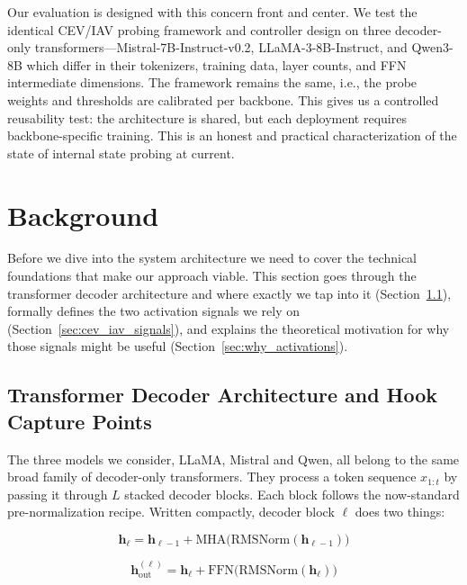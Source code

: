 Our evaluation is designed with this concern front and center. We test the identical CEV/IAV probing framework and controller design on three decoder-only transformers—Mistral-7B-Instruct-v0.2, LLaMA-3-8B-Instruct, and Qwen3-8B which differ in their tokenizers, training data, layer counts, and FFN intermediate dimensions. The framework remains the same, i.e., the probe weights and thresholds are calibrated per backbone. This gives us a controlled reusability test: the architecture is shared, but each deployment requires backbone-specific training. This is an honest and practical characterization of the state of internal state probing at current.

\section{Background}
\label{sec:background}

Before we dive into the system architecture we need to cover the technical foundations that make our approach viable. This section goes through the transformer decoder architecture and where exactly we tap into it (Section~\ref{sec:decoder_arch}), formally defines the two activation signals we rely on (Section~\ref{sec:cev_iav_signals}), and explains the theoretical motivation for why those signals might be useful (Section~\ref{sec:why_activations}).

\subsection{Transformer Decoder Architecture and Hook Capture Points}
\label{sec:decoder_arch}

The three models we consider, LLaMA, Mistral and Qwen, all belong to the same broad family of decoder-only transformers. They process a token sequence $x_{1:t}$ by passing it through $L$ stacked decoder blocks. Each block follows the now-standard pre-normalization recipe. Written compactly, decoder block $\ell$ does two things:

\begin{equation}
    \mathbf{h}_\ell = \mathbf{h}_{\ell-1} + \text{MHA}\bigl(\text{RMSNorm}(\mathbf{h}_{\ell-1})\bigr)
    \label{eq:mha}
\end{equation}

\begin{equation}
    \mathbf{h}_{\text{out}}^{(\ell)} = \mathbf{h}_\ell + \text{FFN}\bigl(\text{RMSNorm}(\mathbf{h}_\ell)\bigr)
    \label{eq:ffn_residual}
\end{equation}


